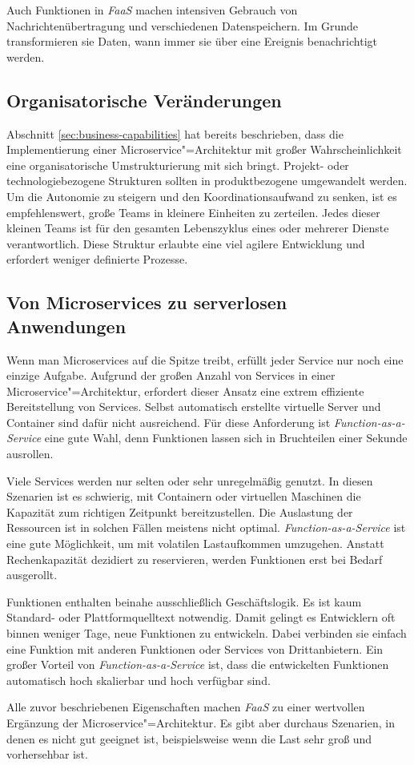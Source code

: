 Auch Funktionen in \textit{FaaS} machen intensiven Gebrauch von Nachrichtenübertragung und verschiedenen Datenspeichern. Im Grunde transformieren sie Daten, wann immer sie über eine Ereignis benachrichtigt werden.

\subsection{Organisatorische Veränderungen}

Abschnitt \ref{sec:business-capabilities} hat bereits beschrieben, dass die Implementierung einer Microservice"=Architektur mit großer Wahrscheinlichkeit eine organisatorische Umstrukturierung mit sich bringt. Projekt- oder technologiebezogene Strukturen sollten in produktbezogene umgewandelt werden. Um die Autonomie zu steigern und den Koordinationsaufwand zu senken, ist es empfehlenswert, große Teams in kleinere Einheiten zu zerteilen. Jedes dieser kleinen Teams ist für den gesamten Lebenszyklus eines oder mehrerer Dienste verantwortlich. Diese Struktur erlaubte eine viel agilere Entwicklung und erfordert weniger definierte Prozesse.

\subsection{Von Microservices zu serverlosen Anwendungen}

Wenn man Microservices auf die Spitze treibt, erfüllt jeder Service nur noch eine einzige Aufgabe. Aufgrund der großen Anzahl von Services in einer Microservice"=Architektur, erfordert dieser Ansatz eine extrem effiziente Bereitstellung von Services. Selbst automatisch erstellte virtuelle Server und Container sind dafür nicht ausreichend. Für diese Anforderung ist \textit{Function-as-a-Service} eine gute Wahl, denn Funktionen lassen sich in Bruchteilen einer Sekunde ausrollen.

Viele Services werden nur selten oder sehr unregelmäßig genutzt. In diesen Szenarien ist es schwierig, mit Containern oder virtuellen Maschinen die Kapazität zum richtigen Zeitpunkt bereitzustellen. Die Auslastung der Ressourcen ist in solchen Fällen meistens nicht optimal. \textit{Function-as-a-Service} ist eine gute Möglichkeit, um mit volatilen Lastaufkommen umzugehen. Anstatt Rechenkapazität dezidiert zu reservieren, werden Funktionen erst bei Bedarf ausgerollt.

Funktionen enthalten beinahe ausschließlich Geschäftslogik. Es ist kaum Standard- oder Plattformquelltext notwendig. Damit gelingt es Entwicklern oft binnen weniger Tage, neue Funktionen zu entwickeln. Dabei verbinden sie einfach eine Funktion mit anderen Funktionen oder Services von Drittanbietern. Ein großer Vorteil von \textit{Function-as-a-Service} ist, dass die entwickelten Funktionen automatisch hoch skalierbar und hoch verfügbar sind.

Alle zuvor beschriebenen Eigenschaften machen \textit{FaaS} zu einer wertvollen Ergänzung der Microservice"=Architektur. Es gibt aber durchaus Szenarien, in denen es nicht gut geeignet ist, beispielsweise wenn die Last sehr groß und vorhersehbar ist.